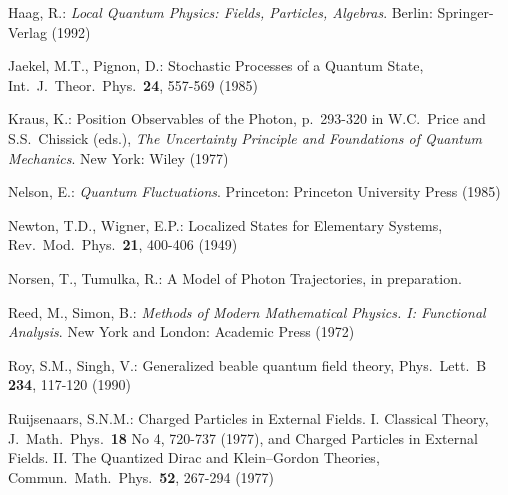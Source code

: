 \documentclass[12pt]{article}
\newcommand{\1}{\mathbf{1}} %
\begin{document}
\begin{thebibliography}{28.}

 Haag, R.: \textit{Local Quantum Physics: Fields,
   Particles, Algebras}.  Berlin: Springer-Verlag (1992)



 Jaekel, M.T., Pignon, D.: Stochastic Processes of a
   Quantum State, Int.\ J.\ Theor.\ Phys.\ \textbf{24}, 557-569
   (1985)

 Kraus, K.: Position Observables of the Photon,
   p.~293-320 in W.C.~Price and S.S.~Chissick (eds.), \textit{The
   Uncertainty Principle and Foundations of Quantum Mechanics}. New
   York: Wiley (1977)



 Nelson, E.: \textit{Quantum Fluctuations}.
   Princeton: Princeton University Press (1985)

 Newton, T.D., Wigner, E.P.: Localized States
   for Elementary Systems, Rev.\ Mod.\ Phys.\ \textbf{21}, 400-406
   (1949)

 Norsen, T., Tumulka, R.: A Model of Photon
   Trajectories, in preparation.


 Reed, M., Simon, B.: \textit{Methods of Modern
   Mathematical Physics. I: Functional Analysis}. New York and London:
   Academic Press (1972)

 Roy, S.M., Singh, V.: Generalized beable quantum
   field theory, Phys.\ Lett.\ B \textbf{234}, 117-120 (1990)

 Ruijsenaars, S.N.M.: Charged Particles in
   External Fields. I. Classical Theory, J.\ Math.\ Phys.\
   \textbf{18} No 4, 720-737 (1977), and Charged Particles in
   External Fields. II. The Quantized Dirac and Klein--Gordon
   Theories, Commun.\ Math.\ Phys.\ \textbf{52}, 267-294 (1977)


\end{thebibliography}
\end{document}
